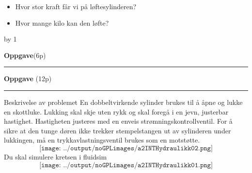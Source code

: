 \documentclass[12pt,a4paper]{article}
\def\oppgave{
            \advance\questnum by 1
	    \ifthenelse{\questnum>0\AND \questnum<9}
	    {
                \vskip 1cm
		\textbf{Oppgave}\hskip 5pt\the\questnum \hfill \hfill(6p)
		\vskip 3pt
		\hrule
	\vskip 0.5cm}
	{
                \vskip 1cm
		\textbf{Oppgave}\hskip 5pt \the\questnum \hfill \hfill(12p)
		\vskip 3pt \hrule \vskip 0.5cm }

		}
\begin{document}
\begin{itemize}
	\item Hvor stor kraft får vi på løftesylinderen?
	\item Hvor mange kilo kan den løfte? 
\end{itemize}
\vskip 5pt 
\vskip 2.5pt 
\newpage
\oppgave{}%
\vskip 1cm 
Beskrivelse av problemet En dobbeltvirkende sylinder brukes til å åpne og lukke en skottluke. Lukking skal skje uten rykk og skal foregå i en jevn, justerbar hastighet. Hastigheten justeres med en enveis strømningskontrollventil.
\vskip 1cm 
For å sikre at den tunge døren ikke trekker stempelstangen ut av sylinderen under lukkingen, må en trykkavlastningsventil brukes som en motstøtte.
\vskip 1cm 
$$\texttt{[image: ../output/noGPLimages/a2INTHydraulikk02.png]}$$
\vskip 1cm 
Du skal simulere kretsen i fluidsim
\vskip 1cm 
$$\texttt{[image: ../output/noGPLimages/a2INTHydraulikk01.png]}$$
\vskip 5pt 
\vskip 2.5pt 
\end{document}
